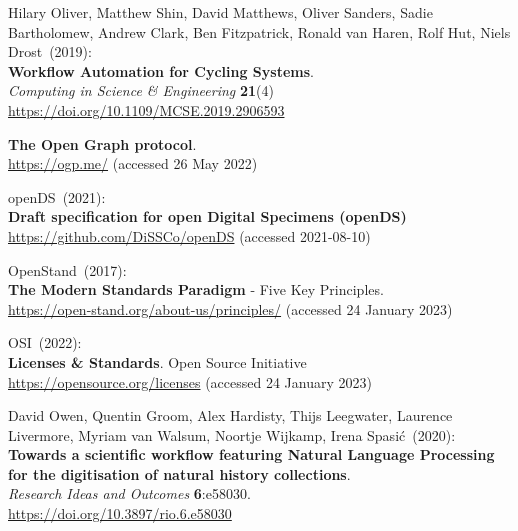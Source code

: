 \begin{thebibliography}{9}
Hilary Oliver, Matthew Shin, David Matthews, Oliver Sanders, Sadie Bartholomew, Andrew Clark, Ben Fitzpatrick, Ronald van Haren, Rolf Hut, Niels Drost~(2019):\\
\textbf{Workflow Automation for Cycling Systems}.\\
\emph{Computing in Science \& Engineering} \textbf{21}(4) \\
\url{https://doi.org/10.1109/MCSE.2019.2906593}


\textbf{The {Open Graph} protocol}.  \\
\url{https://ogp.me/}
(accessed 26 May 2022)

openDS~(2021): \\
\textbf{Draft specification for open Digital Specimens (openDS)}\\
\url{https://github.com/DiSSCo/openDS} (accessed 2021-08-10)

OpenStand~(2017): \\
\textbf{The {Modern Standards Paradigm}} - {Five Key Principles}.\\
\url{https://open-stand.org/about-us/principles/} (accessed 24 January
2023)

OSI~(2022): \\
\textbf{Licenses \& {Standards}}.
Open Source Initiative\\
\url{https://opensource.org/licenses} (accessed 24 January 2023)

David Owen, Quentin Groom, Alex Hardisty, Thijs Leegwater, Laurence Livermore, Myriam van Walsum, Noortje Wijkamp, Irena Spasić~(2020): \\
\textbf{Towards a scientific workflow featuring Natural Language Processing for the digitisation of natural history collections}.\\
\emph{Research Ideas and Outcomes} \textbf{6}:e58030.\\
\url{https://doi.org/10.3897/rio.6.e58030}


\end{thebibliography}
